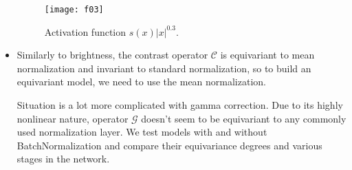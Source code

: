 \begin{itemize}
    \begin{figure}[h]
        \centering
        \texttt{[image: f03]}
        \caption{Activation function $s(x)|x|^{0.3}$.}
        \label{fig:f03}
    \end{figure}
\item Similarly to brightness, the contrast operator $\mathcal{C}$ is
    equivariant to mean normalization and invariant to standard normalization,
    so to build an equivariant model, we need to use the mean normalization.

    Situation is a lot more complicated with gamma correction. Due to its
    highly nonlinear nature, operator
    $\mathcal{G}$ doesn't seem to be equivariant to any
    commonly used normalization layer. We test models with and without
    BatchNormalization and compare their equivariance degrees and various stages
    in the network.
\end{itemize}







